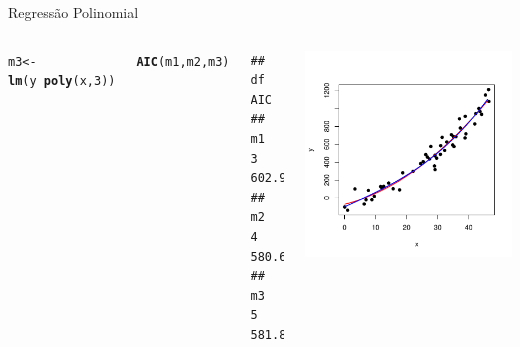 \documentclass{beamer}\usepackage[]{graphicx}\usepackage[]{color}
\makeatletter
\newcommand{\hlnum}[1]{\textcolor[rgb]{0.686,0.059,0.569}{#1}}%
\newcommand{\hlopt}[1]{\textcolor[rgb]{0,0,0}{#1}}%
\newcommand{\hlstd}[1]{\textcolor[rgb]{0.345,0.345,0.345}{#1}}%
\newcommand{\hlkwb}[1]{\textcolor[rgb]{0.69,0.353,0.396}{#1}}%
\newcommand{\hlkwd}[1]{\textcolor[rgb]{0.737,0.353,0.396}{\textbf{#1}}}%
\newenvironment{kframe}{%
 \def\at@end@of@kframe{}%
 \ifinner\ifhmode%
  \def\at@end@of@kframe{\end{minipage}}%
  \begin{minipage}{\columnwidth}%
 \fi\fi%
 \def\FrameCommand##1{\hskip\@totalleftmargin \hskip-\fboxsep
 \colorbox{shadecolor}{##1}\hskip-\fboxsep
     \hskip-\linewidth \hskip-\@totalleftmargin \hskip\columnwidth}%
 \MakeFramed {\advance\hsize-\width
   \@totalleftmargin\z@ \linewidth\hsize
   \@setminipage}}%
 {\par\unskip\endMakeFramed%
 \at@end@of@kframe}
\newenvironment{knitrout}{}{} %
\renewenvironment{knitrout}{\setlength{\topsep}{0mm}}{}
\makeatother
\begin{document}
\begin{frame}[fragile]{Regressão Polinomial}

\begin{columns}

\setlength{\topsep}{2pt}

\begin{knitrout}\tiny
{}\color{fgcolor}\begin{kframe}
\begin{alltt}
\hlstd{m3} \hlkwb{<-} \hlkwd{lm}\hlstd{(y} \hlopt{~} \hlkwd{poly}\hlstd{(x,}\hlnum{3}\hlstd{))}


\hlkwd{AIC}\hlstd{(m1,m2,m3)}
\end{alltt}
\begin{verbatim}
##    df      AIC
## m1  3 602.9227
## m2  4 580.6495
## m3  5 581.8052
\end{verbatim}
\end{kframe}
\end{knitrout}


\begin{knitrout}
\color{fgcolor}
\includegraphics[width=1\linewidth]{figure/samppolallplot3-1} 

\end{knitrout}

\end{columns}

\end{frame}
\end{document}
